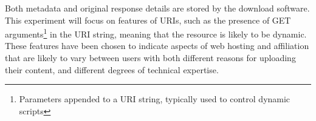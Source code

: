



Both metadata and original response details are stored by the download software.  This experiment will focus on features of URIs, such as the presence of GET arguments\footnote{Parameters appended to a URI string, typically used to control dynamic scripts}
in the URI string, meaning that the resource is likely to be dynamic.  These features have been chosen to indicate aspects of web hosting and affiliation that are likely to vary between users with both different reasons for uploading their content, and different degrees of technical expertise.



